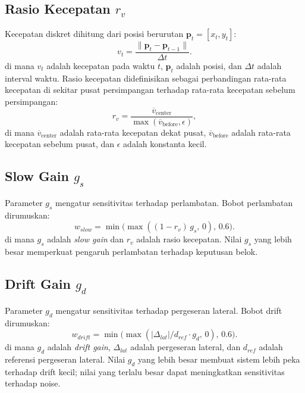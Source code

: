 \documentclass[conference]{IEEEtran}
\begin{document}
\subsection{Rasio Kecepatan $r_v$}
Kecepatan diskret dihitung dari posisi berurutan $\mathbf{p}_t=[x_t,y_t]$:
\begin{equation}
v_t = \frac{\|\mathbf{p}_t-\mathbf{p}_{t-1}\|}{\Delta t}.
\end{equation}
di mana $v_t$ adalah kecepatan pada waktu $t$, $\mathbf{p}_t$ adalah posisi, dan $\Delta t$ adalah interval waktu.
Rasio kecepatan didefinisikan sebagai perbandingan rata-rata kecepatan di sekitar pusat persimpangan terhadap rata-rata kecepatan sebelum persimpangan:
\begin{equation}
r_v = \frac{\overline{v}_{\text{center}}}{\max(\overline{v}_{\text{before}},\epsilon)},
\end{equation}
di mana $\overline{v}_{\text{center}}$ adalah rata-rata kecepatan dekat pusat, $\overline{v}_{\text{before}}$ adalah rata-rata kecepatan sebelum pusat, dan $\epsilon$ adalah konstanta kecil.

\subsection{Slow Gain $g_s$}
Parameter $g_s$ mengatur sensitivitas terhadap perlambatan. Bobot perlambatan dirumuskan:
\begin{equation}
w_{slow}=\min\big(\max((1-r_v)\,g_s,\,0),\,0.6\big).
\end{equation}
di mana $g_s$ adalah \textit{slow gain} dan $r_v$ adalah rasio kecepatan.
Nilai $g_s$ yang lebih besar memperkuat pengaruh perlambatan terhadap keputusan belok.

\subsection{Drift Gain $g_d$}
Parameter $g_d$ mengatur sensitivitas terhadap pergeseran lateral. Bobot drift dirumuskan:
\begin{equation}
w_{drift}=\min\big(\max(|\Delta_{lat}|/d_{ref}\cdot g_d,\,0),\,0.6\big).
\end{equation}
di mana $g_d$ adalah \textit{drift gain}, $\Delta_{lat}$ adalah pergeseran lateral, dan $d_{ref}$ adalah referensi pergeseran lateral.
Nilai $g_d$ yang lebih besar membuat sistem lebih peka terhadap drift kecil; nilai yang terlalu besar dapat meningkatkan sensitivitas terhadap noise.
\end{document}
